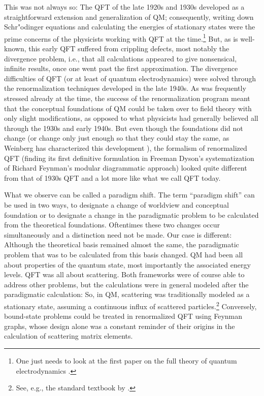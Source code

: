 \documentclass[12pt]{article}
\begin{document}
This was not always so: The QFT of the late 1920s and 1930s developed as a straightforward extension and generalization of QM; consequently, writing down Schr"odinger equations and calculating the energies of stationary states were the prime concerns of the physicists working with QFT at the time.\footnote{One just needs to look at the first paper on the full theory of quantum electrodynamics \citep{heisenberg_1929_zur-quantendynamik}.} But, as is well-known, this early QFT suffered from crippling defects, most notably the divergence problem, i.e., that all calculations appeared to give nonsensical, infinite results, once one went past the first approximation. The divergence difficulties of QFT (or at least of quantum electrodynamics) were solved through the renormalization techniques developed in the late 1940s. As was frequently stressed already at the time, the success of the renormalization program meant that the conceptual foundations of QM could be taken over to field theory with only slight modifications, as opposed to what physicists had generally believed all through the 1930s and early 1940s. But even though the foundations did not change (or change only just enough so that they could stay the same, as Weinberg has characterized this development \citep[p.18]{weinberg_1977_the-search}), the formalism of renormalized QFT (finding its first definitive formulation in Freeman Dyson's systematization of Richard Feynman's modular diagrammatic approach) looked quite different from that of 1930s QFT and a lot more like what we call QFT today.

What we observe can be called a paradigm shift. The term ``paradigm shift'' can be used in two ways, to designate a change of worldview and conceptual foundation or to designate a change in the paradigmatic problem to be calculated from the theoretical foundations. Oftentimes these two changes occur simultaneously and a distinction need not be made. Our case is different: Although the theoretical basis remained almost the same, the paradigmatic problem that was to be calculated from this basis changed. QM had been all about properties of the quantum state, most importantly the associated energy levels. QFT was all about scattering. Both frameworks were of course able to address other problems, but the calculations were in general modeled after the paradigmatic calculation: So, in QM, scattering was traditionally modeled as a stationary state, assuming a continuous influx of scattered particles.\footnote{See, e.g., the standard textbook by \citep[Section IX]{dirac_1935_the-principles}.} Conversely, bound-state problems could be treated in renormalized QFT using Feynman graphs, whose design alone was a constant reminder of their origins in the calculation of scattering matrix elements.
\end{document}

